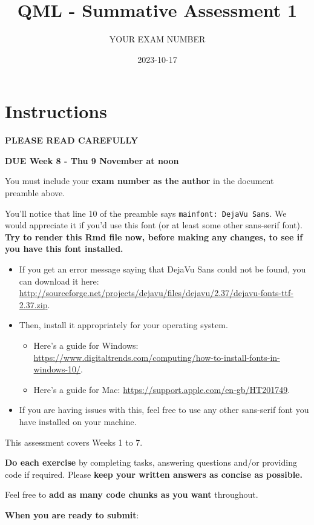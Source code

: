\documentclass[
]{article}
\title{QML - Summative Assessment 1}
\author{YOUR EXAM NUMBER}
\date{2023-10-17}
\providecommand{\tightlist}{%
  \setlength{\itemsep}{0pt}\setlength{\parskip}{0pt}}
\begin{document}
\maketitle

\section{Instructions}\label{instructions}

\textbf{PLEASE READ CAREFULLY}

\textbf{DUE Week 8 - Thu 9 November at noon}

You must include your \textbf{exam number as the author} in the document
preamble above.

You'll notice that line 10 of the preamble says
\texttt{mainfont:\ DejaVu\ Sans}. We would appreciate it if you'd use
this font (or at least some other sans-serif font). \textbf{Try to
render this Rmd file now, before making any changes, to see if you have
this font installed.}

\begin{itemize}
\tightlist
\item
  If you get an error message saying that DejaVu Sans could not be
  found, you can download it here:
  \url{http://sourceforge.net/projects/dejavu/files/dejavu/2.37/dejavu-fonts-ttf-2.37.zip}.
\item
  Then, install it appropriately for your operating system.

  \begin{itemize}
  \tightlist
  \item
    Here's a guide for Windows:
    \url{https://www.digitaltrends.com/computing/how-to-install-fonts-in-windows-10/}.
  \item
    Here's a guide for Mac:
    \url{https://support.apple.com/en-gb/HT201749}.
  \end{itemize}
\item
  If you are having issues with this, feel free to use any other
  sans-serif font you have installed on your machine.
\end{itemize}

This assessment covers Weeks 1 to 7.

\textbf{Do each exercise} by completing tasks, answering questions
and/or providing code if required. Please \textbf{keep your written
answers as concise as possible.}

Feel free to \textbf{add as many code chunks as you want} throughout.

\textbf{When you are ready to submit}:
\end{document}
